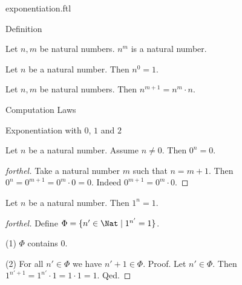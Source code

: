 \documentclass{naproche-library}
\begin{document}
\begin{smodule}[title=Exponentiation]{exponentiation.ftl}

\begin{sfragment}{Definition}
  \begin{signature}[forthel,id=ARITHMETIC_09_3663815629602816]
    Let $n, m$ be natural numbers.
    $n^{m}$ is a natural number.
  \end{signature}

  \begin{axiom}[forthel,id=ARITHMETIC_09_5368818025103360]
    Let $n$ be a natural number.
    Then $n^{0} = 1$.
  \end{axiom}

  \begin{axiom}[forthel,id=ARITHMETIC_09_4140498660884480]
    Let $n, m$ be natural numbers.
    Then $n^{m + 1} = n^{m} \cdot n$.
  \end{axiom}
\end{sfragment}

\begin{sfragment}{Computation Laws}
  \begin{sfragment}{Exponentiation with $0$, $1$ and $2$}
    \begin{proposition}[forthel,id=ARITHMETIC_09_4673644676513792]
      Let $n$ be a natural number.
      Assume $n \neq 0$.
      Then $0^{n} = 0$.
    \end{proposition}
    \begin{proof}[forthel]
      Take a natural number $m$ such that $n = m + 1$.
      Then $0^{n}
        = 0^{m + 1}
        = 0^{m} \cdot 0
        = 0$.
      Indeed $0^{m + 1} = 0^{m} \cdot 0$.
    \end{proof}

    \begin{proposition}[forthel,id=ARITHMETIC_09_7376849881530368]
      Let $n$ be a natural number.
      Then $1^{n} = 1$.
    \end{proposition}
    \begin{proof}[forthel]
      Define $\Phi = \{ n' \in \Nat \mid 1^{n'} = 1 \}$.

      (1) $\Phi$ contains $0$.

      (2) For all $n' \in \Phi$ we have $n' + 1 \in \Phi$. \newline
      Proof.
        Let $n' \in \Phi$.
        Then $1^{n' + 1}
          = 1^{n'} \cdot 1
          = 1 \cdot 1
          = 1$.
      Qed.


\end{proof}
\end{sfragment}
\end{sfragment}
\end{smodule}
\end{document}
